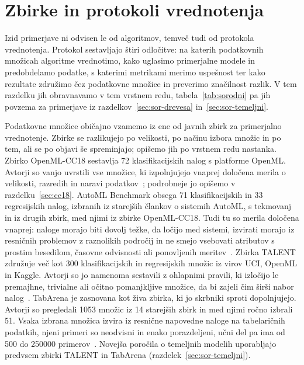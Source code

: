 \documentclass[a4paper,12pt,openright]{book}
\begin{document}
\section{Zbirke in protokoli vrednotenja}
\label{sec:sor-zbirke}

Izid primerjave ni odvisen le od algoritmov, temveč tudi od protokola
vrednotenja. Protokol sestavljajo štiri odločitve: na katerih podatkovnih
množicah algoritme vrednotimo, kako uglasimo primerjalne modele in
predobdelamo podatke, s katerimi metrikami merimo uspešnost ter kako rezultate združimo čez podatkovne množice
in preverimo značilnost razlik. V tem razdelku jih obravnavamo v tem vrstnem
redu, tabela~\ref{tab:sorodni} pa jih povzema za primerjave iz
razdelkov~\ref{sec:sor-drevesa} in~\ref{sec:sor-temeljni}.

Podatkovne množice običajno vzamemo iz ene od javnih zbirk za primerjalno
vrednotenje. Zbirke se razlikujejo po velikosti, po načinu izbora množic in po
tem, ali se po objavi še spreminjajo; opišemo jih po vrstnem redu nastanka.
Zbirko OpenML-CC18 sestavlja 72 klasifikacijskih nalog s platforme OpenML.
Avtorji so vanjo uvrstili vse množice, ki izpolnjujejo vnaprej določena merila
o velikosti, razredih in naravi podatkov~\cite{bischl2021openml}; podrobneje
jo opišemo v razdelku~\ref{sec:cc18}. AutoML Benchmark obsega 71
klasifikacijskih in 33 regresijskih nalog, izbranih iz starejših člankov o
sistemih AutoML, s tekmovanj in iz drugih zbirk, med njimi iz zbirke
OpenML-CC18. Tudi tu so merila določena vnaprej: naloge morajo biti dovolj
težke, da ločijo med sistemi, izvirati morajo iz resničnih problemov z
raznolikih področij in ne smejo vsebovati atributov s prostim besedilom,
časovne odvisnosti ali ponovljenih meritev~\cite{gijsbers2024amlb}. Zbirka
TALENT združuje več kot 300 klasifikacijskih in regresijskih množic iz virov
UCI, OpenML in Kaggle. Avtorji so jo namenoma sestavili z ohlapnimi pravili,
ki izločijo le premajhne, trivialne ali očitno pomanjkljive množice, da bi
zajeli čim širši nabor nalog~\cite{ye2024closer}. TabArena je zasnovana kot
živa zbirka, ki jo skrbniki sproti dopolnjujejo. Avtorji so pregledali 1053
množic iz 14 starejših zbirk in med njimi ročno izbrali 51. Vsaka izbrana
množica izvira iz resnične napovedne naloge na tabelaričnih podatkih, njeni
primeri so neodvisni in enako porazdeljeni, učni del pa ima od 500 do
\num{250000} primerov~\cite{erickson2025tabarena}. Novejša poročila o
temeljnih modelih uporabljajo predvsem zbirki TALENT in TabArena
(razdelek~\ref{sec:sor-temeljni}).
\end{document}

